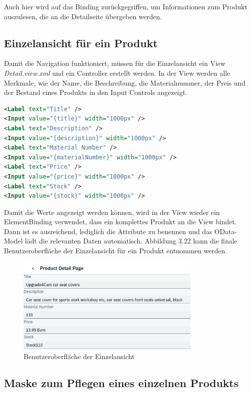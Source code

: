 Auch hier wird auf das Binding zurückgegriffen, um Informationen zum Produkt auszulesen, die an die Detailseite übergeben werden.

\subsection{Einzelansicht für ein Produkt}
Damit die Navigation funktioniert, müssen für die Einzelansicht ein View \textit{Detail.view.xml} und ein Controller erstellt werden. In der View werden alle Merkmale, wie der Name, die Beschreibung, die Materialnummer, der Preis und der Bestand eines Produkts in den Input Controls angezeigt.
\begin{lstlisting}[language=XML, caption=Auszüge aus der View \texttt{Detail.view.xml}]
<Label text="Title" />    		
<Input value="{title}" width="1000px" />
<Label text="Description" /> 		
<Input value="{description}" width="1000px" />
<Label text="Material Number" />	
<Input value="{materialNumber}" width="1000px" />
<Label text="Price" />			
<Input value="{price}" width="1000px" />
<Label text="Stock" />		
<Input value="{stock}" width="1000px" />
\end{lstlisting}
Damit die Werte angezeigt werden können, wird in der View wieder ein ElementBinding verwendet, dass ein komplettes Produkt an die View bindet. Dann ist es ausreichend, lediglich die Attribute zu benennen und das OData-Model lädt die relevanten Daten automatisch. Abbildung 3.22 kann die finale Benutzeroberfläche der Einzelansicht für ein Produkt entnommen werden.
\begin{figure}[htbp]
 \centering
 \includegraphics[width=0.8\textwidth]{Bilder/ui5 freestyle/3_21_Einzelansicht.png}
 \caption{Benutzeroberfläche der Einzelansicht}
\end{figure}

\subsection{Maske zum Pflegen eines einzelnen Produkts}

